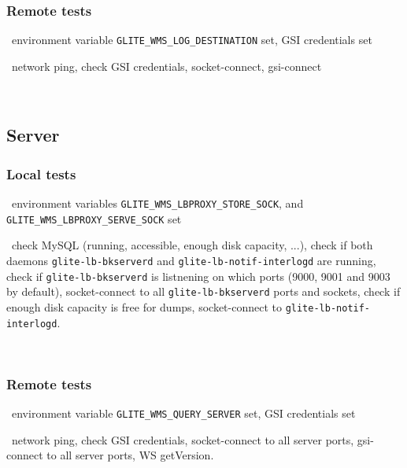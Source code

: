 \subsubsection{Remote tests}
\req\ environment variable \texttt{GLITE\_WMS\_LOG\_DESTINATION} set, GSI credentials set

\what\ network ping,
check GSI credentials,
socket-connect,
gsi-connect

\how\ 


\subsection{Server}

\subsubsection{Local tests}
\req\ environment variables \texttt{GLITE\_WMS\_LBPROXY\_STORE\_SOCK},
and \texttt{GLITE\_WMS\_LBPROXY\_SERVE\_SOCK} set

\what\ check MySQL (running, accessible, enough disk capacity, ...),
check if both daemons \texttt{glite-lb-bkserverd} and \texttt{glite-lb-notif-interlogd} are running,
check if \texttt{glite-lb-bkserverd} is listnening on which ports (9000, 9001 and 9003 by default),
socket-connect to all \texttt{glite-lb-bkserverd} ports and sockets,
check if enough disk capacity is free for dumps,
socket-connect to \texttt{glite-lb-notif-interlogd}.

\how\ 


\subsubsection{Remote tests}
\req\ environment variable \texttt{GLITE\_WMS\_QUERY\_SERVER} set, GSI credentials set

\what\ network ping,
check GSI credentials,
socket-connect to all server ports,
gsi-connect to all server ports,
WS getVersion.

\how\ 



